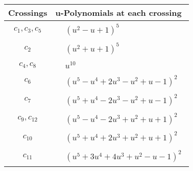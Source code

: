 \documentclass[1p]{elsarticle_modified}
\theoremstyle{definition}
\begin{document}
\begin{tabular}{m{50pt}|m{274pt}}
Crossings & \hspace{64pt}u-Polynomials at each crossing \\
\hline $$\begin{aligned}c_{1},c_{3},c_{5}\end{aligned}$$&$\begin{aligned}
&(u^2- u+1)^5
\end{aligned}$\\
\hline $$\begin{aligned}c_{2}\end{aligned}$$&$\begin{aligned}
&(u^2+u+1)^5
\end{aligned}$\\
\hline $$\begin{aligned}c_{4},c_{8}\end{aligned}$$&$\begin{aligned}
&u^{10}
\end{aligned}$\\
\hline $$\begin{aligned}c_{6}\end{aligned}$$&$\begin{aligned}
&(u^5- u^4+2 u^3- u^2+u-1)^2
\end{aligned}$\\
\hline $$\begin{aligned}c_{7}\end{aligned}$$&$\begin{aligned}
&(u^5+u^4-2 u^3- u^2+u-1)^2
\end{aligned}$\\
\hline $$\begin{aligned}c_{9},c_{12}\end{aligned}$$&$\begin{aligned}
&(u^5- u^4-2 u^3+u^2+u+1)^2
\end{aligned}$\\
\hline $$\begin{aligned}c_{10}\end{aligned}$$&$\begin{aligned}
&(u^5+u^4+2 u^3+u^2+u+1)^2
\end{aligned}$\\
\hline $$\begin{aligned}c_{11}\end{aligned}$$&$\begin{aligned}
&(u^5+3 u^4+4 u^3+u^2- u-1)^2
\end{aligned}$\\
\hline
\end{tabular}\\~\\
\end{document}
